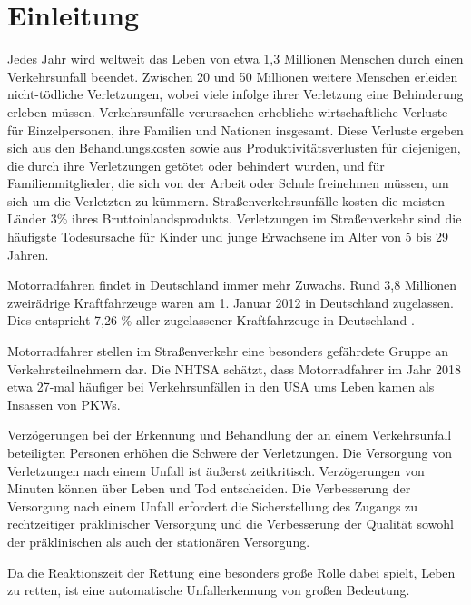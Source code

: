 \chapter{Einleitung}
%
%
%
%
%
%
Jedes Jahr wird weltweit das Leben von etwa 1,3 Millionen Menschen durch einen Verkehrsunfall beendet. Zwischen 20 und 50 Millionen weitere Menschen erleiden nicht-tödliche Verletzungen, wobei viele infolge ihrer Verletzung eine Behinderung erleben müssen. Verkehrsunfälle verursachen erhebliche wirtschaftliche Verluste für Einzelpersonen, ihre Familien und Nationen insgesamt. Diese Verluste ergeben sich aus den Behandlungskosten sowie aus Produktivitätsverlusten für diejenigen, die durch ihre Verletzungen getötet oder behindert wurden, und für Familienmitglieder, die sich von der Arbeit oder Schule freinehmen müssen, um sich um die Verletzten zu kümmern. Straßenverkehrsunfälle kosten die meisten Länder 3\% ihres Bruttoinlandsprodukts. Verletzungen im Straßenverkehr sind die häufigste Todesursache für Kinder und junge Erwachsene im Alter von 5 bis 29 Jahren.\citep{healthorganization2022}

Motorradfahren findet in Deutschland immer mehr Zuwachs.  Rund 3,8 Millionen zweirädrige Kraftfahrzeuge waren am 1. Januar 2012 in Deutschland zugelassen. Dies entspricht 7,26 \% aller zugelassener Kraftfahrzeuge in Deutschland \citep{Haedrich2012}.

Motorradfahrer stellen im Straßenverkehr eine besonders gefährdete Gruppe an Verkehrsteilnehmern dar. Die NHTSA schätzt, dass Motorradfahrer im Jahr 2018 etwa 27-mal häufiger bei Verkehrsunfällen in den USA ums Leben kamen als Insassen von PKWs\citep{NHTSA}.

Verzögerungen bei der Erkennung und Behandlung der an einem Verkehrsunfall beteiligten Personen erhöhen die Schwere der Verletzungen. Die Versorgung von Verletzungen nach einem Unfall ist äußerst zeitkritisch. Verzögerungen von Minuten können über Leben und Tod entscheiden. Die Verbesserung der Versorgung nach einem Unfall erfordert die Sicherstellung des Zugangs zu rechtzeitiger präklinischer Versorgung und die Verbesserung der Qualität sowohl der präklinischen als auch der stationären Versorgung.\citep{healthorganization2022}

Da die Reaktionszeit der Rettung eine besonders große Rolle dabei spielt, Leben zu retten, ist eine automatische Unfallerkennung von großen Bedeutung.

